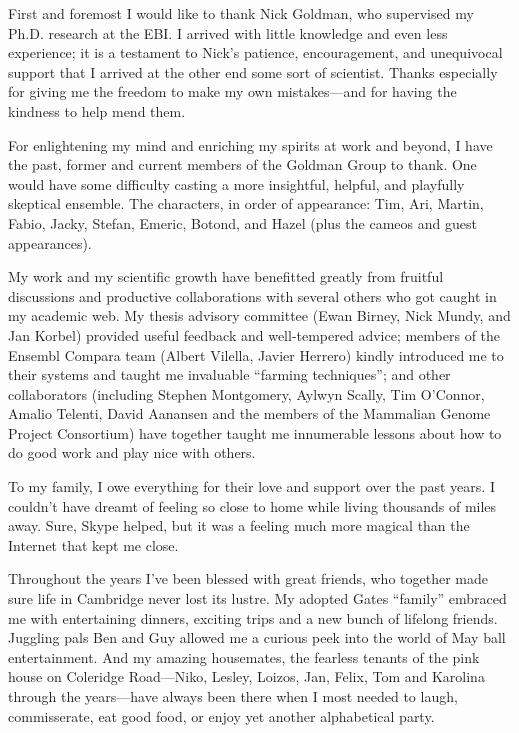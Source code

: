 \begin{acknowledgements}      %

First and foremost I would like to thank Nick Goldman, who supervised
my Ph.D. research at the EBI. I arrived with little knowledge and even
less experience; it is a testament to Nick's patience, encouragement,
and unequivocal support that I arrived at the other end some sort of
scientist. Thanks especially for giving me the freedom to make my own
mistakes---and for having the kindness to help mend them.

For enlightening my mind and enriching my spirits at work and beyond,
I have the past, former and current members of the Goldman Group to
thank. One would have some difficulty casting a more insightful,
helpful, and playfully skeptical ensemble. The characters, in order of
appearance: Tim, Ari, Martin, Fabio, Jacky, Stefan, Emeric, Botond,
and Hazel (plus the cameos and guest appearances).

My work and my scientific growth have benefitted greatly from fruitful
discussions and productive collaborations with several others who got
caught in my academic web. My thesis advisory committee (Ewan Birney,
Nick Mundy, and Jan Korbel) provided useful feedback and well-tempered
advice; members of the Ensembl Compara team (Albert Vilella, Javier
Herrero) kindly introduced me to their systems and taught me
invaluable ``farming techniques''; and other collaborators (including
Stephen Montgomery, Aylwyn Scally, Tim O'Connor, Amalio Telenti, David
Aanansen and the members of the Mammalian Genome Project Consortium)
have together taught me innumerable lessons about how to do good work
and play nice with others.

To my family, I owe everything for their love and support over the
past years. I couldn't have dreamt of feeling so close to home while
living thousands of miles away. Sure, Skype helped, but it was a
feeling much more magical than the Internet that kept me close.

Throughout the years I've been blessed with great friends, who
together made sure life in Cambridge never lost its lustre. My adopted
Gates ``family'' embraced me with entertaining dinners, exciting trips
and a new bunch of lifelong friends. Juggling pals Ben and Guy allowed
me a curious peek into the world of May ball entertainment. And my
amazing housemates, the fearless tenants of the pink house on
Coleridge Road---Niko, Lesley, Loizos, Jan, Felix, Tom and Karolina
through the years---have always been there when I most needed to
laugh, commisserate, eat good food, or enjoy yet another alphabetical
party.


\end{acknowledgements}
